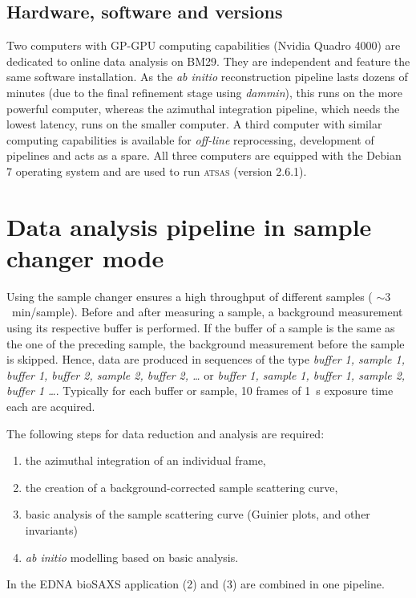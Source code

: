 \documentclass[preprint,pdf]{iucr}              %
\begin{document}
\subsection{Hardware, software and versions}
Two computers with GP-GPU computing capabilities (Nvidia Quadro 4000) are
dedicated to online data analysis on BM29. 
They are independent and feature the same software installation.
As the \textit{ab initio} reconstruction pipeline lasts dozens of minutes
(due to the final refinement stage using \textit{dammin}), this runs on the
more powerful computer, whereas the azimuthal integration pipeline, which needs
the lowest latency, runs on the smaller computer.
A third computer with similar computing capabilities is available for
\textit{off-line} reprocessing, development of pipelines and acts as a spare.
All three computers are equipped with the Debian 7 operating system and are
used to run \textsc{atsas} (version 2.6.1).



\section{Data analysis pipeline in sample changer mode}

Using the sample changer ensures a high throughput of different samples (
$\sim 3$~min/sample).
Before and after measuring a sample, a background measurement using its
respective buffer is performed.
If the buffer of a sample is the same as the one of the preceding sample, the
background measurement before the sample is skipped.
Hence, data are produced in sequences of the type \textit{buffer 1, sample 1,
buffer 1, buffer 2, sample 2, buffer 2, \ldots}  or  \textit{buffer 1, sample 1,
buffer 1,  sample 2, buffer 1 \ldots}.
Typically for each buffer or sample, 10 frames of 1~s exposure time each are
acquired.

The following steps for data reduction and analysis are required:
\begin{enumerate}
\item the azimuthal integration of an individual frame,
\item the creation of a background-corrected sample scattering curve,
\item basic analysis of the sample scattering curve (Guinier plots, and other
invariants)
\item \textit{ab initio} modelling based on basic analysis.
\end{enumerate}
In the EDNA bioSAXS application (2) and (3) are combined in one pipeline.
\end{document}
